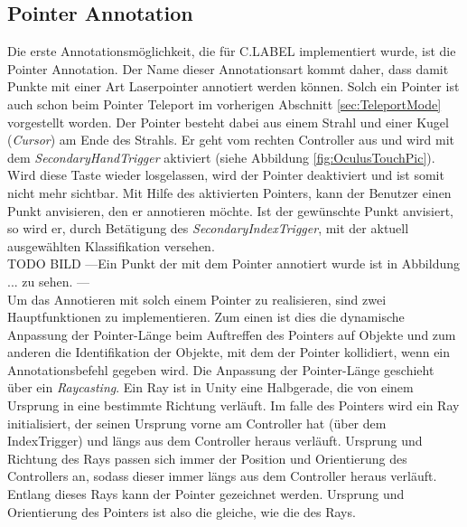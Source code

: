 \subsection{Pointer Annotation}
\label{sec:SimplePointerAnnotation}
Die erste Annotationsmöglichkeit, die für C.LABEL implementiert wurde, ist die Pointer Annotation. Der Name dieser Annotationsart kommt daher, dass damit Punkte mit einer Art Laserpointer annotiert werden können. Solch ein Pointer ist auch schon beim Pointer Teleport im vorherigen Abschnitt \ref{sec:TeleportMode} vorgestellt worden. Der Pointer besteht dabei aus einem Strahl und einer Kugel (\textit{Cursor}) am Ende des Strahls. Er geht vom rechten Controller aus und wird mit dem \textit{SecondaryHandTrigger} aktiviert (siehe Abbildung \ref{fig:OculusTouchPic}). Wird diese Taste wieder losgelassen, wird der Pointer deaktiviert und ist somit nicht mehr sichtbar. Mit Hilfe des aktivierten Pointers, kann der Benutzer einen Punkt anvisieren, den er annotieren möchte. Ist der gewünschte Punkt anvisiert, so wird er, durch Betätigung des \textit{SecondaryIndexTrigger}, mit der aktuell ausgewählten Klassifikation versehen. \\

TODO BILD
---Ein Punkt der mit dem Pointer annotiert wurde ist in Abbildung ... zu sehen. ---\\

Um das Annotieren mit solch einem Pointer zu realisieren, sind zwei Hauptfunktionen zu implementieren. Zum einen ist dies die dynamische Anpassung der Pointer-Länge beim Auftreffen des Pointers auf Objekte und zum anderen die Identifikation der Objekte, mit dem der Pointer kollidiert, wenn ein Annotationsbefehl gegeben wird. Die Anpassung der Pointer-Länge geschieht über ein \textit{Raycasting}. Ein Ray ist in Unity eine Halbgerade, die von einem Ursprung in eine bestimmte Richtung verläuft. Im falle des Pointers wird ein Ray initialisiert, der seinen Ursprung vorne am Controller hat (über dem IndexTrigger) und längs aus dem Controller heraus verläuft. Ursprung und Richtung des Rays passen sich immer der Position und Orientierung des Controllers an, sodass dieser immer längs aus dem Controller heraus verläuft. Entlang dieses Rays kann der Pointer gezeichnet werden. Ursprung und Orientierung des Pointers ist also die gleiche, wie die des Rays.\\ 

